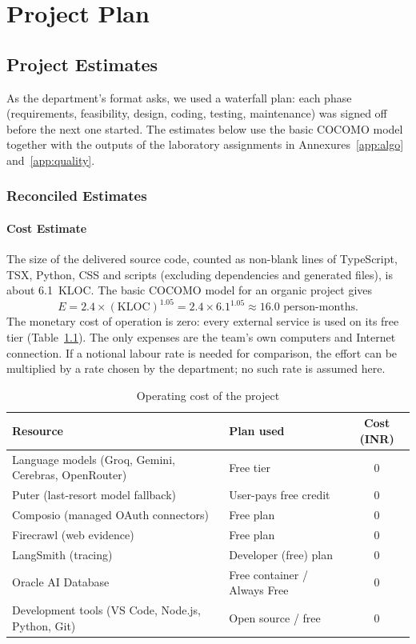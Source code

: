 \documentclass[oneside,a4paper,12pt]{report}
\begin{document}
\chapter{Project Plan}

\section{Project Estimates}
As the department's format asks, we used a waterfall plan: each phase (requirements, feasibility, design, coding, testing, maintenance) was signed off before the next one started. The estimates below use the basic COCOMO model together with the outputs of the laboratory assignments in Annexures~\ref{app:algo} and~\ref{app:quality}.
\subsection{Reconciled Estimates}
\subsubsection{Cost Estimate}
The size of the delivered source code, counted as non-blank lines of TypeScript, TSX, Python, CSS and scripts (excluding dependencies and generated files), is about 6.1~KLOC. The basic COCOMO model for an organic project gives
\[ E = 2.4 \times (\mathrm{KLOC})^{1.05} = 2.4 \times 6.1^{1.05} \approx 16.0 \mbox{ person-months}. \]
The monetary cost of operation is zero: every external service is used on its free tier (Table~\ref{tab:cost}). The only expenses are the team's own computers and Internet connection. If a notional labour rate is needed for comparison, the effort can be multiplied by a rate chosen by the department; no such rate is assumed here.

\begin{table}[!htbp]
\begin{center}
\def\arraystretch{1.3}
\begin{tabular}{| l | l | c |}
\hline
Resource & Plan used & Cost (INR) \\ \hline
Language models (Groq, Gemini, Cerebras, OpenRouter) & Free tier & 0 \\ \hline
Puter (last-resort model fallback) & User-pays free credit & 0 \\ \hline
Composio (managed OAuth connectors) & Free plan & 0 \\ \hline
Firecrawl (web evidence) & Free plan & 0 \\ \hline
LangSmith (tracing) & Developer (free) plan & 0 \\ \hline
Oracle AI Database & Free container / Always Free & 0 \\ \hline
Development tools (VS Code, Node.js, Python, Git) & Open source / free & 0 \\ \hline
\end{tabular}
\end{center}
\caption{Operating cost of the project}
\label{tab:cost}
\end{table}
\end{document}
